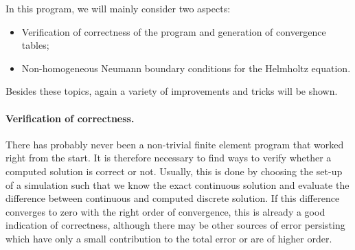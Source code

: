 \documentclass{article}
\begin{document}
In this program, we will mainly consider two aspects:
\begin{itemize}
\item Verification of correctness of the program and generation of convergence
tables;
\item Non-homogeneous Neumann boundary conditions for the Helmholtz equation.
\end{itemize}
Besides these topics, again a variety of improvements and tricks will be
shown. 

\paragraph{Verification of correctness.} There has probably never been a
non-trivial finite element program that worked right from the start. It is
therefore necessary to find ways to verify whether a computed solution is
correct or not. Usually, this is done by choosing the set-up of a simulation
such that we know the exact continuous solution and evaluate the difference
between continuous and computed discrete solution. If this difference
converges to zero with the right order of convergence, this is already a good
indication of correctness, although there may be other sources of error
persisting which have only a small contribution to the total error or are of
higher order.
\end{document}
